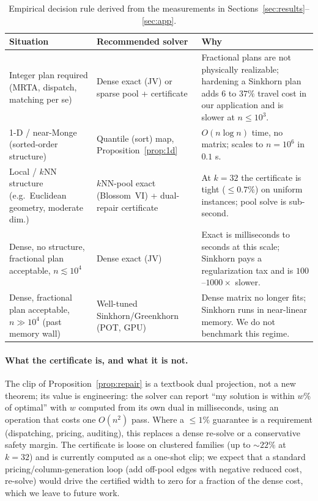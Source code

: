\documentclass[11pt]{article}
\theoremstyle{remark}
\begin{document}
\begin{table}[t]
\centering\small\renewcommand{\arraystretch}{1.35}
\begin{tabular}{p{3.9cm}p{3.7cm}p{8.0cm}}
\hline\hline
\textbf{Situation} & \textbf{Recommended solver} & \textbf{Why} \\
\hline
Integer plan required (MRTA, dispatch, matching per se)
  & Dense exact (JV) or sparse pool + certificate
  & Fractional plans are not physically realizable; hardening a
    Sinkhorn plan adds $6$ to $37\%$ travel cost in our application
    and is slower at $n\le 10^3$. \\
\hline
1-D / near-Monge (sorted-order structure)
  & Quantile (sort) map, Proposition~\ref{prop:1d}
  & $O(n\log n)$ time, no matrix; scales to $n=10^6$ in $0.1$ s. \\
\hline
Local / $k$NN structure (e.g.\ Euclidean geometry, moderate dim.)
  & $k$NN-pool exact (Blossom~VI) + dual-repair certificate
  & At $k=32$ the certificate is tight ($\le 0.7\%$) on uniform
    instances; pool solve is sub-second. \\
\hline
Dense, no structure, fractional plan acceptable, $n\lesssim 10^4$
  & Dense exact (JV)
  & Exact is milliseconds to seconds at this scale; Sinkhorn pays a
    regularization tax and is $100$--$1000\times$ slower. \\
\hline
Dense, fractional plan acceptable, $n\gg 10^4$ (past memory wall)
  & Well-tuned Sinkhorn/Greenkhorn (POT, GPU)
  & Dense matrix no longer fits; Sinkhorn runs in near-linear memory.
    We do not benchmark this regime. \\
\hline\hline
\end{tabular}
\caption{Empirical decision rule derived from the measurements in
Sections~\ref{sec:results}--\ref{sec:app}.}
\label{tab:decision}
\end{table}

\paragraph{What the certificate is, and what it is not.}
The clip of Proposition~\ref{prop:repair} is a textbook dual projection,
not a new theorem; its value is engineering: the solver can report ``my
solution is within $w\%$ of optimal'' with $w$ computed from its own
dual in milliseconds, using an operation that costs one $O(n^2)$ pass.
Where a $\le 1\%$ guarantee is a requirement (dispatching, pricing,
auditing), this replaces a dense re-solve or a conservative safety margin.
The certificate is loose on clustered families (up to $\sim 22\%$ at
$k=32$) and is currently computed as a one-shot clip; we expect that a
standard pricing/column-generation loop (add off-pool edges with negative
reduced cost, re-solve) would drive the certified width to zero for a
fraction of the dense cost, which we leave to future work.
\end{document}
